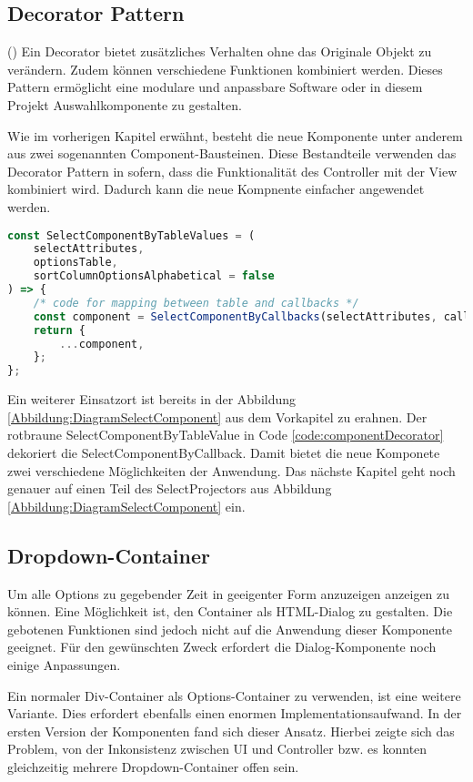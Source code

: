 \subsection{Decorator Pattern}

(\cite{decoratorPattern}) Ein Decorator bietet zusätzliches Verhalten ohne das Originale Objekt zu verändern.
Zudem können verschiedene Funktionen kombiniert werden.
Dieses Pattern ermöglicht eine modulare und anpassbare Software oder in diesem Projekt Auswahlkomponente zu gestalten.

Wie im vorherigen Kapitel erwähnt, besteht die neue Komponente unter anderem aus zwei sogenannten Component-Bausteinen.
Diese Bestandteile verwenden das Decorator Pattern in sofern, dass die Funktionalität des Controller mit der View kombiniert wird.
Dadurch kann die neue Kompnente einfacher angewendet werden.

\begin{lstlisting}[language = js, caption = SelectComponentByTableValue dekoriert SelectComponentByCallback, label = code:componentDecorator]
const SelectComponentByTableValues = (
    selectAttributes,
    optionsTable,
    sortColumnOptionsAlphabetical = false
) => {
    /* code for mapping between table and callbacks */
    const component = SelectComponentByCallbacks(selectAttributes, callbacks);
    return {
        ...component,
    };
};
\end{lstlisting}

Ein weiterer Einsatzort ist bereits in der Abbildung \ref{Abbildung:DiagramSelectComponent} aus dem Vorkapitel zu erahnen.
Der rotbraune SelectComponentByTableValue in Code \ref{code:componentDecorator} dekoriert die SelectComponentByCallback.
Damit bietet die neue Komponete zwei verschiedene Möglichkeiten der Anwendung.
Das nächste Kapitel geht noch genauer auf einen Teil des SelectProjectors aus Abbildung \ref{Abbildung:DiagramSelectComponent} ein.


\subsection{Dropdown-Container}

Um alle Options zu gegebender Zeit in geeigenter Form anzuzeigen anzeigen zu können.
Eine Möglichkeit ist, den Container als HTML-Dialog zu gestalten.
Die gebotenen Funktionen sind jedoch nicht auf die Anwendung dieser Komponente geeignet.
Für den gewünschten Zweck erfordert die Dialog-Komponente noch einige Anpassungen.

Ein normaler Div-Container als Options-Container zu verwenden, ist eine weitere Variante.
Dies erfordert ebenfalls einen enormen Implementationsaufwand.
In der ersten Version der Komponenten fand sich dieser Ansatz.
Hierbei zeigte sich das Problem, von der Inkonsistenz zwischen UI und Controller bzw. es konnten gleichzeitig mehrere Dropdown-Container offen sein.

